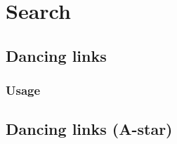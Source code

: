 \section{Search}
\subsection{Dancing links}

\subsubsection{Usage}


\subsection{Dancing links (A-star)}

